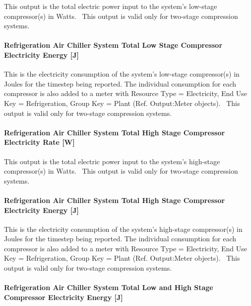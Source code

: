This output is the total electric power input to the system's low-stage compressor(s) in Watts.~ This output is valid only for two-stage compression systems.

\paragraph{Refrigeration Air Chiller System Total Low Stage Compressor Electricity Energy {[}J{]}}\label{refrigeration-air-chiller-system-total-low-stage-compressor-electric-energy-j}

This is the electricity consumption of the system's low-stage compressor(s) in Joules for the timestep being reported. The individual consumption for each compressor is also added to a meter with Resource Type = Electricity, End Use Key = Refrigeration, Group Key = Plant (Ref. Output:Meter objects).~ This output is valid only for two-stage compression systems.

\paragraph{Refrigeration Air Chiller System Total High Stage Compressor Electricity Rate {[}W{]}}\label{refrigeration-air-chiller-system-total-high-stage-compressor-electric-power-w}

This output is the total electric power input to the system's high-stage compressor(s) in Watts.~ This output is valid only for two-stage compression systems.

\paragraph{Refrigeration Air Chiller System Total High Stage Compressor Electricity Energy {[}J{]}}\label{refrigeration-air-chiller-system-total-high-stage-compressor-electric-energy-j}

This is the electricity consumption of the system's high-stage compressor(s) in Joules for the timestep being reported. The individual consumption for each compressor is also added to a meter with Resource Type = Electricity, End Use Key = Refrigeration, Group Key = Plant (Ref. Output:Meter objects).~ This output is valid only for two-stage compression systems.

\paragraph{Refrigeration Air Chiller System Total Low and High Stage Compressor Electricity Energy {[}J{]}}\label{refrigeration-air-chiller-system-total-low-and-high-stage-compressor-electric-energy-j}


